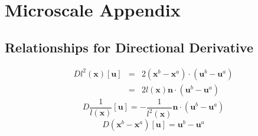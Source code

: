\chapter{Microscale Appendix}
\section{Relationships for Directional Derivative}
\label{app:relationships}
\begin{eqnarray}
Dl^2(\textbf{x})[\mathbf{u}] &=& 2 (\textbf{x}^b - \textbf{x}^a) \cdot (\textbf{u}^b - \textbf{u}^a) \nonumber\\
&=& 2 l(\textbf{x})\textbf{n} \cdot (\textbf{u}^b - \textbf{u}^a) 
\label{Dl^2}
\end{eqnarray}
%
\begin{equation}
D\frac{1}{l(\textbf{x})}[\textbf{u}] = -\frac{1}{l^{2}(\textbf{x})}\textbf{n} \cdot (\textbf{u}^b - \textbf{u}^a)
\label{Dl^-1}
\end{equation}
%
\begin{equation}
D(\textbf{x}^b - \textbf{x}^a)[\textbf{u}] = \textbf{u}^b - \textbf{u}^a
\label{D(xb-xa)}
\end{equation}
%